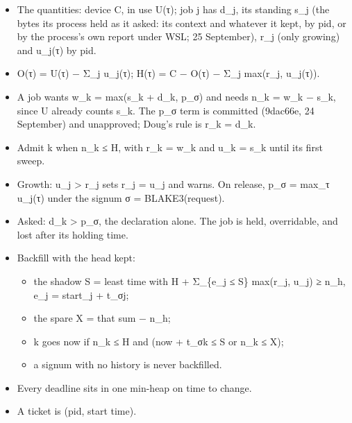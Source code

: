 \begin{itemize}
\item The quantities: device C, in use U(τ); job j has d\_\allowbreak{}j, its standing s\_\allowbreak{}j (the bytes its process held as it asked: its context and whatever it kept, by pid, or by the process's own report under WSL; 25 September), r\_\allowbreak{}j (only growing) and u\_\allowbreak{}j(τ) by pid.
\item O(τ) = U(τ) − Σ\_\allowbreak{}j u\_\allowbreak{}j(τ); H(τ) = C − O(τ) − Σ\_\allowbreak{}j max(r\_\allowbreak{}j, u\_\allowbreak{}j(τ)).
\item A job wants w\_\allowbreak{}k = max(s\_\allowbreak{}k + d\_\allowbreak{}k, p\_\allowbreak{}σ) and needs n\_\allowbreak{}k = w\_\allowbreak{}k − s\_\allowbreak{}k, since U already counts s\_\allowbreak{}k. The p\_\allowbreak{}σ term is committed (9dac66e, 24 September) and unapproved; Doug's rule is r\_\allowbreak{}k = d\_\allowbreak{}k.
\item Admit k when n\_\allowbreak{}k ≤ H, with r\_\allowbreak{}k = w\_\allowbreak{}k and u\_\allowbreak{}k = s\_\allowbreak{}k until its first sweep.
\item Growth: u\_\allowbreak{}j > r\_\allowbreak{}j sets r\_\allowbreak{}j = u\_\allowbreak{}j and warns. On release, p\_\allowbreak{}σ = max\_\allowbreak{}τ u\_\allowbreak{}j(τ) under the signum σ = BLAKE3(request).
\item Asked: d\_\allowbreak{}k > p\_\allowbreak{}σ, the declaration alone. The job is held, overridable, and lost after its holding time.
\item Backfill with the head kept:

\begin{itemize}
\item the shadow S = least time with H + Σ\_\allowbreak{}\{e\_\allowbreak{}j ≤ S\} max(r\_\allowbreak{}j, u\_\allowbreak{}j) ≥ n\_\allowbreak{}h, e\_\allowbreak{}j = start\_\allowbreak{}j + t\_\allowbreak{}σj;
\item the spare X = that sum − n\_\allowbreak{}h;
\item k goes now if n\_\allowbreak{}k ≤ H and (now + t\_\allowbreak{}σk ≤ S or n\_\allowbreak{}k ≤ X);
\item a signum with no history is never backfilled.
\end{itemize}
\item Every deadline sits in one min-heap on time to change.
\item A ticket is (pid, start time).
\end{itemize}

